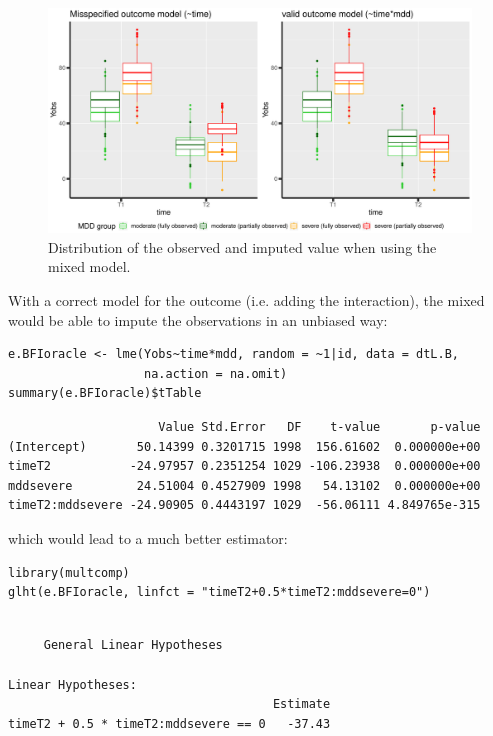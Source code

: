 \documentclass[12pt]{article}
\begin{document}
\clearpage

\begin{figure}[!h]
\centering
\includegraphics[width=\textwidth]{./figures/gg-imputationModel.pdf}
\caption{\label{fig:imputationModel}Distribution of the observed and imputed value when using the mixed model.}
\end{figure}

With a correct model for the outcome (i.e. adding the interaction),
the mixed would be able to impute the observations in an unbiased way:
\lstset{language=r,label= ,caption= ,captionpos=b,numbers=none}
\begin{lstlisting}
e.BFIoracle <- lme(Yobs~time*mdd, random = ~1|id, data = dtL.B,
                   na.action = na.omit)
summary(e.BFIoracle)$tTable
\end{lstlisting}

\begin{verbatim}
                     Value Std.Error   DF    t-value       p-value
(Intercept)       50.14399 0.3201715 1998  156.61602  0.000000e+00
timeT2           -24.97957 0.2351254 1029 -106.23938  0.000000e+00
mddsevere         24.51004 0.4527909 1998   54.13102  0.000000e+00
timeT2:mddsevere -24.90905 0.4443197 1029  -56.06111 4.849765e-315
\end{verbatim}


which would lead to a much better estimator:
\lstset{language=r,label= ,caption= ,captionpos=b,numbers=none}
\begin{lstlisting}
library(multcomp)
glht(e.BFIoracle, linfct = "timeT2+0.5*timeT2:mddsevere=0")
\end{lstlisting}

\begin{verbatim}

	 General Linear Hypotheses

Linear Hypotheses:
                                     Estimate
timeT2 + 0.5 * timeT2:mddsevere == 0   -37.43
\end{verbatim}
\end{document}
